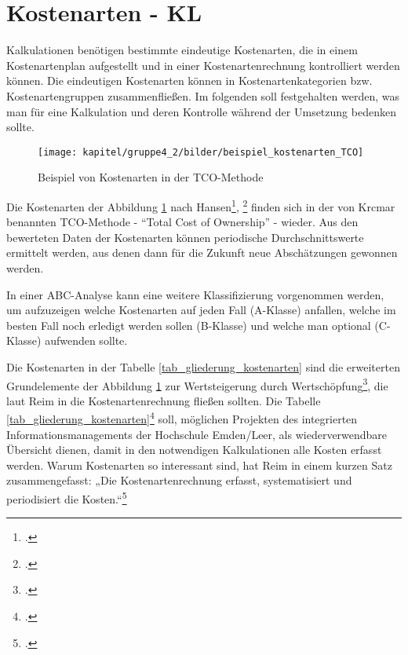 
\section{Kostenarten - KL}

\label{section_kostenarten}
Kalkulationen benötigen bestimmte eindeutige Kostenarten, die in einem Kostenartenplan aufgestellt und in einer Kostenartenrechnung kontrolliert werden können. Die eindeutigen Kostenarten können in Kostenartenkategorien bzw. Kostenartengruppen zusammenfließen. Im folgenden soll festgehalten werden, was man für eine Kalkulation und deren Kontrolle w\"ahrend der Umsetzung bedenken sollte.

\begin{figure}[h]
	\centering
	\texttt{[image: kapitel/gruppe4\_2/bilder/beispiel\_kostenarten\_TCO]}
	\caption{Beispiel von Kostenarten in der TCO-Methode}
	\label{fig_kostenarten_TCO}
\end{figure}

Die Kostenarten der Abbildung \ref{fig_kostenarten_TCO} nach Hansen\footcite[495]{hansen_business_2009}, \footcite[Vgl.][314, 355]{muller2013betriebswirtschaftslehre} finden sich in der von Krcmar benannten TCO-Methode - \enquote{Total Cost of Ownership} - wieder. Aus den bewerteten Daten der Kostenarten können periodische Durchschnittswerte ermittelt werden, aus denen dann für die Zukunft neue Abschätzungen gewonnen werden.
\clearpage

In einer ABC-Analyse kann eine weitere Klassifizierung vorgenommen werden, um aufzuzeigen welche Kostenarten auf jeden Fall (A-Klasse) anfallen, welche im besten Fall noch erledigt werden sollen (B-Klasse) und welche man optional (C-Klasse) aufwenden sollte.

Die Kostenarten in der Tabelle \ref{tab_gliederung_kostenarten} sind die erweiterten Grundelemente der Abbildung \ref{fig_kostenarten_TCO} zur Wertsteigerung durch Wertschöpfung\footcite[125-128]{reim_erfolgsrechnung_2015}, die laut Reim in die Kostenartenrechnung fließen sollten. Die Tabelle \ref{tab_gliederung_kostenarten}\footcite[138]{reim_erfolgsrechnung_2015} soll, m\"oglichen Projekten des integrierten Informationsmanagements der Hochschule Emden/Leer, als wiederverwendbare Übersicht dienen, damit in den notwendigen Kalkulationen alle Kosten erfasst werden. Warum Kostenarten so interessant sind, hat Reim in einem kurzen Satz zusammengefasst: „Die Kostenartenrechnung erfasst, systematisiert und periodisiert die Kosten.“\footcite[137-147]{reim_erfolgsrechnung_2015}

